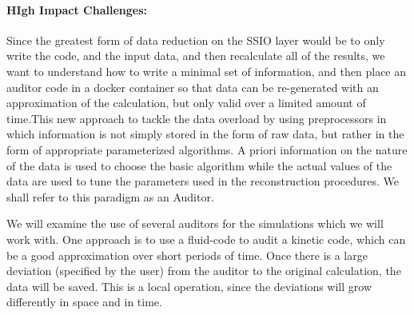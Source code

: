 \paragraph{HIgh Impact Challenges:}
Since the greatest form of data reduction on the SSIO layer would be to only write the code, and the input data,
and then recalculate all of the results, we want to understand how to write a minimal set of information, and then place an auditor 
code in a docker container so that data can be re-generated with an approximation of the calculation, but only valid over a limited amount 
of time.This new approach to tackle the data overload by
using preprocessors in which information is not simply stored in the form of
raw data, but rather in the form of appropriate parameterized algorithms. A
priori information on the nature of the data is used to choose the basic
algorithm while the actual values of the data are used to tune the parameters
used in the reconstruction procedures. We shall refer to this paradigm as an
Auditor.

We will examine the use of several auditors for the simulations which we will work with. One approach is to use a fluid-code to audit a kinetic
code, which can be a good approximation over short periods of time. Once there is a large deviation (specified by the user) from the auditor
to the original calculation, the data will be saved. This is a local operation, since the deviations will grow differently in space and in time. 

